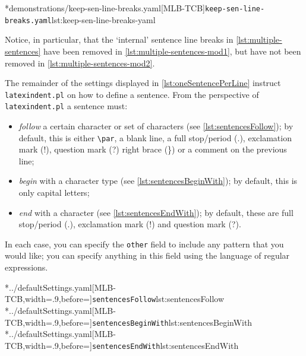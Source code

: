 	\begin{cmhtcbraster}
		\cmhlistingsfromfile[style=yaml-LST]*{demonstrations/keep-sen-line-breaks.yaml}[MLB-TCB]{\texttt{keep-sen-line-breaks.yaml}}{lst:keep-sen-line-breaks-yaml}
	\end{cmhtcbraster}

	Notice, in particular, that the `internal' sentence line breaks in
	\cref{lst:multiple-sentences} have been removed in \cref{lst:multiple-sentences-mod1}, but have
	not been removed in \cref{lst:multiple-sentences-mod2}.

	The remainder of the settings displayed in \vref{lst:oneSentencePerLine} instruct
	\texttt{latexindent.pl} on how to define a sentence. From the perspective of
	\texttt{latexindent.pl} a sentence must:
	\begin{itemize}
		\item \emph{follow} a certain character or set of characters (see
		      \cref{lst:sentencesFollow}); by default, this is either \lstinline!\par!, a
		      blank line, a full stop/period (.), exclamation mark (!), question mark (?) right brace
		      (\}) or a comment on the previous line;
		\item \emph{begin} with a character type (see \cref{lst:sentencesBeginWith}); by
		      default, this is only capital letters;
		\item \emph{end} with a character (see \cref{lst:sentencesEndWith}); by
		      default, these are full stop/period (.), exclamation mark (!) and question mark (?).
	\end{itemize}
	In each case, you can specify the \texttt{other} field to include any
	pattern that you would like; you can specify anything in this field using the language of
	regular expressions.

	\begin{cmhtcbraster}[raster columns=3,
			raster left skip=-3.5cm,
			raster right skip=-2cm,
			raster column skip=.06\linewidth]
		\cmhlistingsfromfile[style=sentencesFollow]*{../defaultSettings.yaml}[MLB-TCB,width=.9\linewidth,before=\centering]{\texttt{sentencesFollow}}{lst:sentencesFollow}
		\cmhlistingsfromfile[style=sentencesBeginWith]*{../defaultSettings.yaml}[MLB-TCB,width=.9\linewidth,before=\centering]{\texttt{sentencesBeginWith}}{lst:sentencesBeginWith}
		\cmhlistingsfromfile[style=sentencesEndWith]*{../defaultSettings.yaml}[MLB-TCB,width=.9\linewidth,before=\centering]{\texttt{sentencesEndWith}}{lst:sentencesEndWith}
	\end{cmhtcbraster}

